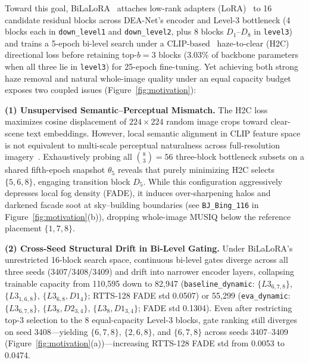 \documentclass[10pt,twocolumn,letterpaper]{article}
\begin{document}
Toward this goal, BiLaLoRA~\cite{bilalora2026} attaches low-rank adapters (LoRA)~\cite{lora2022} to 16 candidate residual blocks across DEA-Net's encoder and Level-3 bottleneck (4 blocks each in \texttt{down\_level1} and \texttt{down\_level2}, plus 8 blocks $D_1$--$D_8$ in \texttt{level3}) and trains a 5-epoch bi-level search under a CLIP-based~\cite{clip2021} haze-to-clear (H2C) directional loss before retaining top-$b=3$ blocks (3.03\% of backbone parameters when all three lie in \texttt{level3}) for 25-epoch fine-tuning. Yet achieving both strong haze removal and natural whole-image quality under an equal capacity budget exposes two coupled issues (Figure~\ref{fig:motivation}):

\textbf{(1) Unsupervised Semantic--Perceptual Mismatch.} The H2C loss maximizes cosine displacement of $224\times 224$ random image crops toward clear-scene text embeddings. However, local semantic alignment in CLIP feature space is not equivalent to multi-scale perceptual naturalness across full-resolution imagery~\cite{perception2018,musiq2021}. Exhaustively probing all $\binom{8}{3}=56$ three-block bottleneck subsets on a shared fifth-epoch snapshot $\theta_5$ reveals that purely minimizing H2C selects $\{5,6,8\}$, engaging transition block $D_5$. While this configuration aggressively depresses local fog density (FADE), it induces over-sharpening halos and darkened facade soot at sky--building boundaries (see \texttt{BJ\_Bing\_116} in Figure~\ref{fig:motivation}(b)), dropping whole-image MUSIQ below the reference placement $\{1,7,8\}$.

\textbf{(2) Cross-Seed Structural Drift in Bi-Level Gating.} Under BiLaLoRA's unrestricted 16-block search space, continuous bi-level gates diverge across all three seeds (3407/3408/3409) and drift into narrower encoder layers, collapsing trainable capacity from 110,595 down to 82,947 (\texttt{baseline\_dynamic}: $\{L3_{6,7,8}\}$, $\{L3_{1,6,8}\}$, $\{L3_{6,8},D1_4\}$; RTTS-128 FADE std 0.0507) or 55,299 (\texttt{eva\_dynamic}: $\{L3_{6,7,8}\}$, $\{L3_8,D2_{3,4}\}$, $\{L3_8,D1_{3,4}\}$; FADE std 0.1304). Even after restricting top-3 selection to the 8 equal-capacity Level-3 blocks, gate ranking still diverges on seed 3408---yielding $\{6,7,8\}$, $\{2,6,8\}$, and $\{6,7,8\}$ across seeds 3407--3409 (Figure~\ref{fig:motivation}(a))---increasing RTTS-128 FADE std from 0.0053 to 0.0474.
\end{document}
